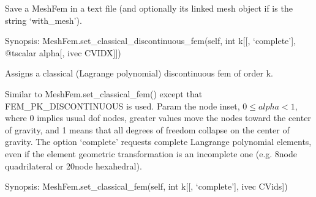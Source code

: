 \documentclass[a4paper,11pt,english]{sphinxmanual}
\begin{document}
\begin{fulllineitems}
\begin{fulllineitems}
\end{fulllineitems}


\begin{fulllineitems}
\label{\detokenize{python/cmdref_MeshFem:getfem.MeshFem.save}}
Save a MeshFem in a text file (and optionally its linked mesh object
if  is the string ‘with\_mesh’).

\end{fulllineitems}


\begin{fulllineitems}
\label{\detokenize{python/cmdref_MeshFem:getfem.MeshFem.set_classical_discontinuous_fem}}
Synopsis: MeshFem.set\_classical\_discontinuous\_fem(self, int k{[}{[}, ‘complete’{]}, @tscalar alpha{[}, ivec CVIDX{]}{]})

Assigns a classical (Lagrange polynomial) discontinuous fem of order k.

Similar to MeshFem.set\_classical\_fem() except that
FEM\_PK\_DISCONTINUOUS is used. Param  the node inset,
\(0 \leq alpha < 1\), where 0 implies usual dof nodes, greater values
move the nodes toward the center of gravity, and 1 means that all
degrees of freedom collapse on the center of gravity.
The option ‘complete’ requests complete Langrange polynomial elements,
even if the element geometric transformation is an incomplete one
(e.g. 8\sphinxhyphen{}node quadrilateral or 20\sphinxhyphen{}node hexahedral).

\end{fulllineitems}


\begin{fulllineitems}
\label{\detokenize{python/cmdref_MeshFem:getfem.MeshFem.set_classical_fem}}
Synopsis: MeshFem.set\_classical\_fem(self, int k{[}{[}, ‘complete’{]}, ivec CVids{]})


\end{fulllineitems}
\end{fulllineitems}
\end{document}
